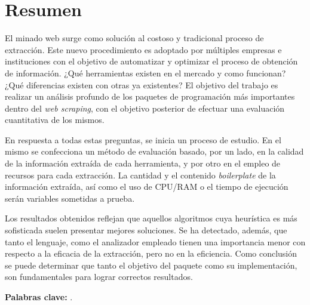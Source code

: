 \chapter*{Resumen}
\label{cha:resumen}


El minado web surge como solución al costoso y tradicional proceso de extracción. Este nuevo procedimiento 
es adoptado por múltiples empresas e instituciones con el objetivo de automatizar y optimizar el proceso 
de obtención de información. ¿Qué herramientas existen en el mercado y como funcionan? ¿Qué diferencias
existen con otras ya existentes? El objetivo del trabajo es realizar un análisis profundo de los paquetes
de programación más importantes dentro del \emph{web scraping}, con el objetivo posterior de efectuar una
evaluación cuantitativa de los mismos.

En respuesta a todas estas preguntas, se inicia un proceso de estudio. En el mismo se confecciona un método
de evaluación basado, por un lado, en la calidad de la información extraída de cada herramienta, y por 
otro en el empleo de recursos para cada extracción. La cantidad y el contenido \emph{boilerplate} de la 
información extraída, así como el uso de CPU/RAM o el tiempo de ejecución serán variables sometidas a prueba.

Los resultados obtenidos reflejan que aquellos algoritmos cuya heurística es más sofisticada suelen
presentar mejores soluciones. Se ha detectado, además, que tanto el lenguaje, como el analizador empleado
tienen una importancia menor con respecto a la eficacia de la extracción, pero no en la eficiencia. Como
conclusión se puede determinar que tanto el objetivo del paquete como su implementación, son fundamentales
para lograr correctos resultados.

\textbf{Palabras clave:} \mybookpalabrasclave.